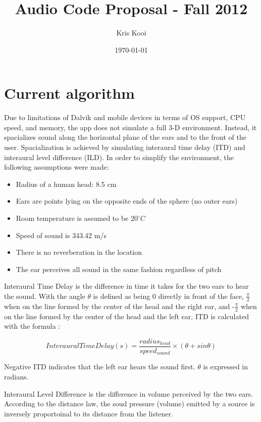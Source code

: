 \documentclass[12pt, letterpaper, draft]{article}
\author{Kris Kooi}
\title{Audio Code Proposal - Fall 2012}
\date{\today}
\begin{document}
\maketitle

\section*{Current algorithm}

Due to limitations of Dalvik and mobile devices in terms of OS
support, CPU speed, and memory, the app does not
simulate a full 3-D environment. Instead, it spacializes sound along
the horizontal plane of the ears and to the front of the user.
Spacialization is achieved by simulating interaural time delay (ITD)
and interaural level difference (ILD). In order to simplify the
environment, the following assumptions were made:

\begin{itemize}
\item Radius of a human head: 8.5 cm
\item Ears are points lying on the opposite ends of the sphere (no
  outer ears)
\item Room temperature is assumed to be $20^{\circ}C$
\item Speed of sound is 343.42 m/s
\item There is no reverberation in the location
\item The ear perceives all sound in the same fashion regardless of
  pitch
\end{itemize}

Interaural Time Delay is the difference in time it takes for the two
ears to hear the sound. With the angle $\theta$ is defined as being 0
directly in front of the face, $\frac{\pi}{2}$ when on the line formed by the
center of the head and the right ear, and -$\frac{\pi}{2}$ when on the line
formed by the center of the head and the left ear, ITD is calculated
with the formula :

\begin{equation}
Interaural Time Delay (s) = \frac{radius_{head}}{speed_{sound}} \times
(\theta + sin \theta)
\end{equation}

Negative ITD indicates that the left ear hears the sound first.
$\theta$ is expressed in radians.

Interaural Level Difference is the difference in volume perceived by
the two ears. According to the distance law, the soud pressure
(volume) emitted by a source is inversely proportoinal to its distance
from the listener. 
\end{document}
